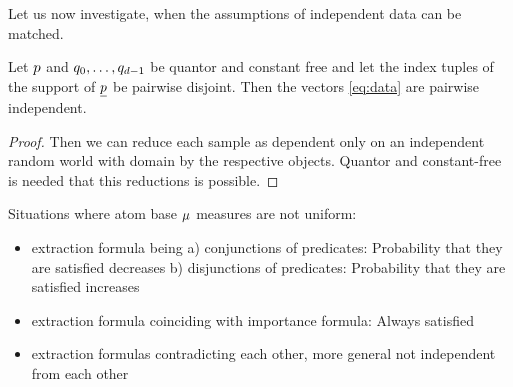 Let us now investigate, when the assumptions of independent data can be matched.

\begin{lemma}
	Let $p$ and $q_{0},\ldots,q_{d-1}$ be quantor and constant free and let the index tuples of the support of $\underline{p}$ be pairwise disjoint.
	Then the vectors \eqref{eq:data} are pairwise independent.
\end{lemma}
\begin{proof}
	Then we can reduce each sample as dependent only on an independent random world with domain by the respective objects.
	Quantor and constant-free is needed that this reductions is possible.
\end{proof}



Situations where atom base $\mu$ measures are not uniform:
\begin{itemize}
	\item extraction formula being a) conjunctions of predicates: Probability that they are satisfied decreases
							b) disjunctions of predicates: Probability that they are satisfied increases
	\item extraction formula coinciding with importance formula: Always satisfied
	 \item extraction formulas contradicting each other, more general not independent from each other
\end{itemize}



%
%

